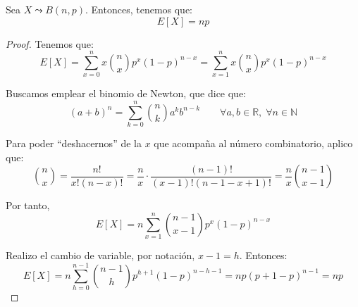 \begin{prop}
    Sea $X\leadsto B(n,p)$. Entonces, tenemos que:
    \begin{equation*}
        E[X] = np
    \end{equation*}
\end{prop}
\begin{proof}
    Tenemos que:
    \begin{equation*}
        E[X] = \sum_{x=0}^n x \binom{n}{x}p^x (1-p)^{n-x} = \sum_{x=1}^n x\binom{n}{x}p^x (1-p)^{n-x}
    \end{equation*}

    Buscamos emplear el binomio de Newton, que dice que:
    \begin{equation*}
        (a+b)^n = \sum_{k=0}^n \binom{n}{k} a^kb^{n-k} \qquad \forall a,b\in \mathbb{R}, \;\forall n\in \mathbb{N}
    \end{equation*}

    Para poder ``deshacernos'' de la $x$ que acompaña al número combinatorio, aplico que:
    \begin{equation*}
        \binom{n}{x} = \frac{n!}{x!(n-x)!} = \frac{n}{x}\cdot \frac{(n-1)!}{(x-1)!(n-1-x+1)!} = \frac{n}{x}\binom{n-1}{x-1}
    \end{equation*}

    Por tanto,
    \begin{equation*}
        E[X] = n \sum_{x=1}^n \binom{n-1}{x-1}p^x (1-p)^{n-x}
    \end{equation*}

    Realizo el cambio de variable, por notación, $x-1=h$. Entonces:
    \begin{equation*}
        E[X] = n \sum_{h=0}^{n-1} \binom{n-1}{h}p^{h+1} (1-p)^{n-h-1} = np(p+1-p)^{n-1} = np
    \end{equation*}
    
\end{proof}

